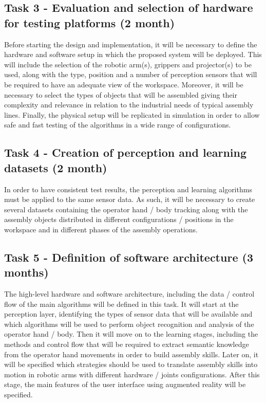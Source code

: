 \subsection{Task 3 - Evaluation and selection of hardware for testing platforms (2 month)}

Before starting the design and implementation, it will be necessary to define the hardware and software setup in which the proposed system will be deployed. This will include the selection of the robotic arm(s), grippers and projector(s) to be used, along with the type, position and a number of perception sensors that will be required to have an adequate view of the workspace. Moreover, it will be necessary to select the types of objects that will be assembled giving their complexity and relevance in relation to the industrial needs of typical assembly lines.
Finally, the physical setup will be replicated in simulation in order to allow safe and fast testing of the algorithms in a wide range of configurations.


\subsection{Task 4 - Creation of perception and learning datasets (2 month)}

In order to have consistent test results, the perception and learning algorithms must be applied to the same sensor data. As such, it will be necessary to create several datasets containing the operator hand / body tracking along with the assembly objects distributed in different configurations / positions in the workspace and in different phases of the assembly operations.


\subsection{Task 5 - Definition of software architecture (3 months)}

The high-level hardware and software architecture, including the data / control flow of the main algorithms will be defined in this task. It will start at the perception layer, identifying the types of sensor data that will be available and which algorithms will be used to perform object recognition and analysis of the operator hand / body. Then it will move on to the learning stages, including the methods and control flow that will be required to extract semantic knowledge from the operator hand movements in order to build assembly skills. Later on, it will be specified which strategies should be used to translate assembly skills into motion in robotic arms with different hardware / joints configurations. After this stage, the main features of the user interface using augmented reality will be specified.



